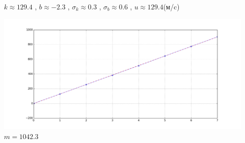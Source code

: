\documentclass[8pt]{article}
\begin{document}
\begin{enumerate}
\begin{itemize}
        \indent $k \approx 129.4$  , $b \approx -2.3$ , $\sigma_k \approx 0.3$ , $\sigma_b \approx 0.6$ , $u \approx 129.4$(м/c) \\
        
        \begin{center} 
            \includegraphics[width=5in]{m0.png} \\ \tiny{$m = 1042.3$}
        \end{center}


\end{itemize}
\end{enumerate}
\end{document}
